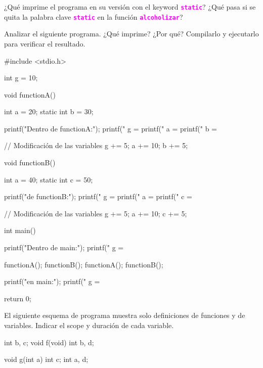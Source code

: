 \documentclass[]{scrartcl}
\newcommand{\hl}[1]{\textcolor{magenta}{\textbf{\texttt{#1}}}}
\begin{document}
\begin{exbox}
  ¿Qué imprime el programa en su versión con el keyword \hl{static}? ¿Qué pasa si se quita la palabra clave \hl{static} en la función \hl{alcoholizar}?
\end{exbox}

\begin{exbox}
  Analizar el siguiente programa. ¿Qué imprime? ¿Por qué? Compilarlo y ejecutarlo para verificar el resultado.
  \begin{ccode}
  #include <stdio.h>

  int g = 10;  
  
  void functionA() {
      int a = 20;  
      static int b = 30;  
  
      printf("Dentro de functionA:\n");
      printf("  g = %
      printf("  a = %
      printf("  b = %
  
      // Modificación de las variables
      g += 5;  
      a += 10;
      b += 5;
  }
  
  void functionB() {
      int a = 40;
      static int c = 50;  
  
      printf("\nDentro de functionB:\n");
      printf("  g = %
      printf("  a = %
      printf("  c = %
  
      // Modificación de las variables
      g += 5;
      a += 10;
      c += 5;
  }
  
  int main() {
      printf("Dentro de main:\n");
      printf("  g = %
  
      functionA();
      functionB();
      functionA();
      functionB();
  
      printf("\nFinal en main:\n");
      printf("  g = %
  
      return 0;
  }
  \end{ccode}
\end{exbox}

\begin{exbox}[]
El siguiente esquema de programa muestra solo definiciones de funciones y de variables. Indicar el scope y duración de cada variable. 

\begin{ccode}
  int b, c;
  void f(void)
  {
    int b, d;
  }

  void g(int a)
  {
    int c;
    {
      int a, d;
    }
  }
\end{ccode}

\end{exbox}
\end{document}
